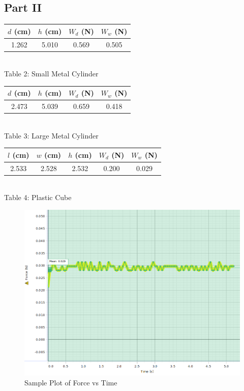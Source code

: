 \documentclass[12pt]{article}
\begin{document}
        \subsection*{Part II}
        \begin{center}
            \begin{tabular}{c|c|c|c}
                \(d\) (cm) & \(h\) (cm) & \(W_d\) (N) & \(W_w\) (N)\\
                \hline
                1.262 & 5.010 & 0.569 & 0.505\\
            \end{tabular}\\[6pt]
            Table 2: Small Metal Cylinder\\[12pt]
            \begin{tabular}{c|c|c|c}
                \(d\) (cm) & \(h\) (cm) & \(W_d\) (N) & \(W_w\) (N)\\
                \hline
                2.473 & 5.039 & 0.659 & 0.418
            \end{tabular}\\[6pt]
            Table 3: Large Metal Cylinder\\[12pt]
            \begin{tabular}{c|c|c|c|c}
                \(l\) (cm) & \(w\) (cm) & \(h\) (cm) & \(W_d\) (N) & \(W_w\) (N)\\
                \hline
                2.533 & 2.528 & 2.532 & 0.200 & 0.029
            \end{tabular}\\[6pt]
            Table 4: Plastic Cube
        \end{center}
        \begin{figure}[H]
            \centering
            \includegraphics[width=0.75\linewidth]{force_time.png}
            \caption{Sample Plot of Force vs Time}
        \end{figure}
\end{document}
